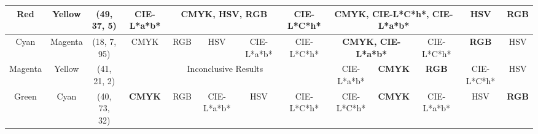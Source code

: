 \begin{table}[htbp]
{\begin{tabular}{@{}ccclcccccccccc@{}}
    Red                     & \multicolumn{1}{c|}{Yellow}                    & \multicolumn{2}{c|}{\cellcolor[HTML]{FF8000}(49, 37, 5)}   & \multicolumn{1}{c|}{CIE-L*a*b*}                            & \multicolumn{3}{c|}{\textbf{CMYK, HSV, RGB}}                                                           & \multicolumn{1}{c|}{CIE-L*C*h*} & \multicolumn{3}{c|}{\textbf{CMYK, CIE-L*C*h*, CIE-L*a*b*}}                                                                                                      & \multicolumn{1}{c|}{HSV}                          & \multicolumn{1}{c|}{\textbf{RGB}}                 \\ \midrule
    Cyan                    & \multicolumn{1}{c|}{Magenta}                   & \multicolumn{2}{c|}{\cellcolor[HTML]{0000FF}(18, 7, 95)}   & \multicolumn{1}{c|}{CMYK}                                  & \multicolumn{1}{c|}{RGB}           & \multicolumn{1}{c|}{HSV}        & \multicolumn{1}{c|}{CIE-L*a*b*} & \multicolumn{1}{c|}{CIE-L*C*h*} & \multicolumn{2}{c|}{\textbf{CMYK, CIE-L*a*b*}}                                                              & \multicolumn{1}{c|}{CIE-L*C*h*}                   & \multicolumn{1}{c|}{\textbf{RGB}}                 & \multicolumn{1}{c|}{HSV}                          \\ \midrule
    Magenta                 & \multicolumn{1}{c|}{Yellow}                    & \multicolumn{2}{c|}{\cellcolor[HTML]{FF0000}(41, 21, 2)}   & \multicolumn{5}{c|}{Inconclusive Results}                                                                                                                                                             & \multicolumn{1}{c|}{CIE-L*a*b*}                      & \multicolumn{1}{c|}{\textbf{CMYK}}                   & \multicolumn{1}{c|}{\textbf{RGB}}                 & \multicolumn{1}{c|}{CIE-L*C*h*}                   & \multicolumn{1}{c|}{HSV}                          \\ \midrule
    Green                   & \multicolumn{1}{c|}{Cyan}                      & \multicolumn{2}{c|}{\cellcolor[HTML]{00FF80}(40, 73, 32)}  & \multicolumn{1}{c|}{\textbf{CMYK}}                         & \multicolumn{1}{c|}{RGB}           & \multicolumn{1}{c|}{CIE-L*a*b*} & \multicolumn{1}{c|}{HSV}        & \multicolumn{1}{c|}{CIE-L*C*h*} & \multicolumn{1}{c|}{CIE-L*C*h*}                      & \multicolumn{1}{c|}{\textbf{CMYK}}                   & \multicolumn{1}{c|}{CIE-L*a*b*}                   & \multicolumn{1}{c|}{HSV}                          & \multicolumn{1}{c|}{\textbf{RGB}}                 \\ \midrule

\end{tabular}}
\end{table}
